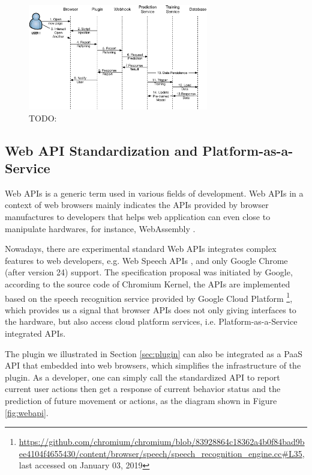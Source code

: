 \begin{figure}[H]
    \centering
    \includegraphics[width=0.7\textwidth]{figures/arch}
    \caption{TODO:}
    \label{fig:arch}
\end{figure}

\subsection{Web API Standardization and Platform-as-a-Service}

Web APIs is a generic term used in various fields of development.
Web APIs in a context of web browsers mainly indicates the APIs provided
by browser manufactures to developers that helps web application can even close
to manipulate hardwares, for instance, WebAssembly \cite{w3c2018ws}.

Nowadays, there are experimental standard Web APIs integrates complex features to 
web developers, e.g. Web Speech APIs \cite{mozilla2019speech}, and 
only Google Chrome (after version 24) support. 
The specification proposal was initiated by Google, according to 
the source code of Chromium Kernel, the APIs are implemented based on 
the speech recognition service provided 
by Google Cloud Platform 
\footnote{\url{https://github.com/chromium/chromium/blob/83928864c18362a4b0f84bad9bee4104f4655430/content/browser/speech/speech\_recognition\_engine.cc\#L35}, last accessed on January 03, 2019},
which provides us a signal that browser APIs does not only giving interfaces to
the hardware, but also access cloud platform services, i.e. Platform-as-a-Service integrated 
APIs.

The plugin we illustrated in Section \ref{sec:plugin} can also be integrated as a PaaS API
that embedded into web browsers, which simplifies the infrastructure of the plugin. 
As a developer, one can simply call the standardized API to report current user actions
then get a response of current behavior status and the prediction of future movement or 
actions, as the diagram shown in Figure \ref{fig:webapi}.

